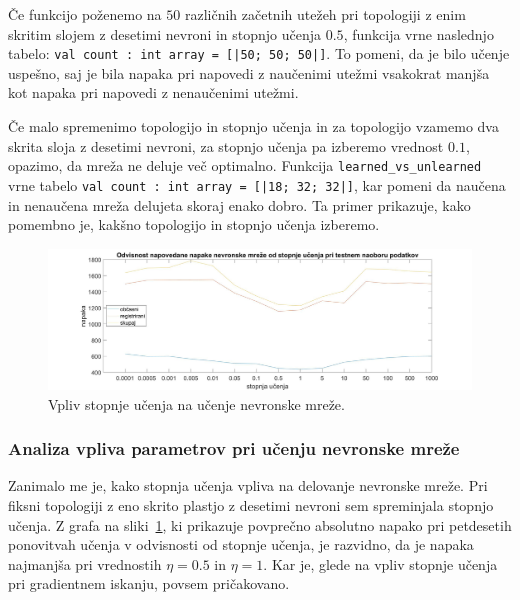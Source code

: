 \documentclass[mat1]{fmfdelo}
\begin{document}
Če funkcijo poženemo na $50$ različnih začetnih utežeh pri topologiji z enim skritim slojem z desetimi nevroni in stopnjo učenja $0.5$, funkcija vrne naslednjo tabelo:
\texttt{val count : int array = [|50; 50; 50|]}. To pomeni, da je bilo učenje uspešno, saj je bila napaka pri napovedi z naučenimi utežmi vsakokrat manjša kot napaka pri napovedi z nenaučenimi utežmi.

Če malo spremenimo topologijo in stopnjo učenja in za topologijo vzamemo dva skrita sloja z desetimi nevroni, za stopnjo učenja pa izberemo vrednost $0.1$, opazimo, da mreža ne deluje več optimalno. Funkcija \-  \texttt{learned\-\_vs\-\_unlearned} vrne tabelo \texttt{val count : int array = [|18; 32; 32|]}, kar pomeni da naučena in nenaučena mreža delujeta skoraj enako dobro. Ta primer prikazuje, kako pomembno je, kakšno topologijo in stopnjo učenja izberemo. 

\begin{figure}[!h]
	\centering
	\includegraphics[width=1\textwidth]{rate.jpg}
	\caption{Vpliv stopnje učenja na učenje nevronske mreže.}
	\label{fig:rate}
\end{figure}

\subsubsection{Analiza vpliva parametrov pri učenju nevronske mreže}
Zanimalo me je, kako stopnja učenja vpliva na delovanje nevronske mreže. Pri fiksni topologiji z eno skrito plastjo z desetimi nevroni sem spreminjala stopnjo učenja. Z grafa na sliki~\ref{fig:rate}, ki prikazuje povprečno absolutno napako pri petdesetih ponovitvah učenja v odvisnosti od stopnje učenja, je razvidno, da je napaka najmanjša pri vrednostih $\eta = 0.5$ in $\eta = 1$. Kar je, glede na vpliv stopnje učenja pri gradientnem iskanju, povsem pričakovano.
\end{document}
